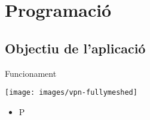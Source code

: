 \section{Programació}
\subsection{Objectiu de l'aplicació}
    \begin{frame}{Funcionament}
        \begin{center}
        \texttt{[image: images/vpn-fullymeshed]}
        \end{center}
        \begin{itemize}
\item P
        \end{itemize}
    \end{frame}
